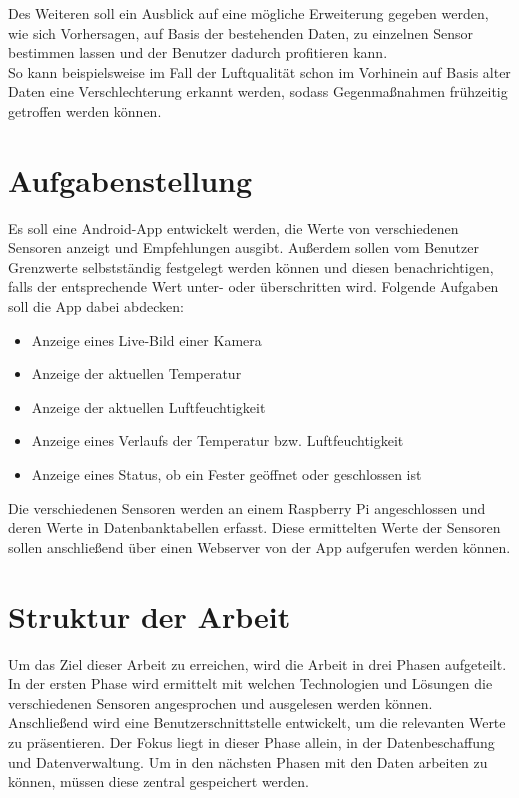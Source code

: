 Des Weiteren soll ein Ausblick auf eine mögliche Erweiterung gegeben werden, wie sich Vorhersagen, auf Basis der bestehenden Daten, zu einzelnen Sensor bestimmen lassen und der Benutzer dadurch profitieren kann.\\ So kann beispielsweise im Fall der Luftqualität schon im Vorhinein auf Basis alter Daten eine Verschlechterung erkannt werden, sodass Gegenmaßnahmen frühzeitig getroffen werden können.


\section{Aufgabenstellung}
Es soll eine Android-App entwickelt werden, die Werte von verschiedenen Sensoren anzeigt und Empfehlungen ausgibt. Außerdem sollen vom Benutzer Grenzwerte selbstständig festgelegt werden können und diesen benachrichtigen, falls der entsprechende Wert unter- oder überschritten wird. 
Folgende Aufgaben soll die App dabei abdecken:
\begin{itemize}
	\item Anzeige eines Live-Bild einer Kamera
	\item Anzeige der aktuellen Temperatur
	\item Anzeige der aktuellen Luftfeuchtigkeit
	\item Anzeige eines Verlaufs der Temperatur bzw. Luftfeuchtigkeit
	\item Anzeige eines Status, ob ein Fester geöffnet oder geschlossen ist
\end{itemize} 
Die verschiedenen Sensoren werden an einem Raspberry Pi angeschlossen und deren Werte in Datenbanktabellen erfasst. Diese ermittelten Werte der Sensoren sollen anschließend über einen Webserver von der App aufgerufen werden können.


\section{Struktur der Arbeit}
Um das Ziel dieser Arbeit zu erreichen, wird die Arbeit in drei Phasen aufgeteilt. In der ersten Phase wird ermittelt mit welchen Technologien und Lösungen die verschiedenen Sensoren angesprochen und ausgelesen werden können. Anschließend wird eine Benutzerschnittstelle entwickelt, um die relevanten Werte zu präsentieren. Der Fokus liegt in dieser Phase allein, in der Datenbeschaffung und Datenverwaltung. Um in den nächsten Phasen mit den Daten arbeiten zu können, müssen diese zentral gespeichert werden.

